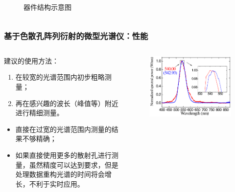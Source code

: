 \begin{frame}[c]
\begin{columns}
\begin{column}{.4\textwidth}
\begin{figure}[!htb]
                \caption{器件结构示意图}
            \end{figure}
        \end{column}
    \end{columns}
\end{frame}

\begin{frame}[c]
    \frametitle{基于色散孔阵列衍射的微型光谱仪：性能}
    \begin{columns}
        \begin{column}{.5\textwidth}
            建议的使用方法：
            \begin{enumerate}
                \item 在较宽的光谱范围内初步粗略测量；
                \item 再在感兴趣的波长（峰值等）附近进行精细测量。
            \end{enumerate}
            \begin{itemize}
                \item 直接在过宽的光谱范围内测量的结果不够精确；
                \item 如果直接使用更多的散射孔进行测量，虽然精度可以达到要求，但是处理数据重构光谱的时间将会增长，不利于实时应用。
            \end{itemize}
        \end{column}
        \begin{column}{.5\textwidth}
            \begin{figure}[!htb] %
                \centering %
                \includegraphics[width=1.\textwidth]{figures/Miniature spectrometer based on diffraction in a dispersive hole array_2.png} %

\end{figure}
\end{column}
\end{columns}
\end{frame}
